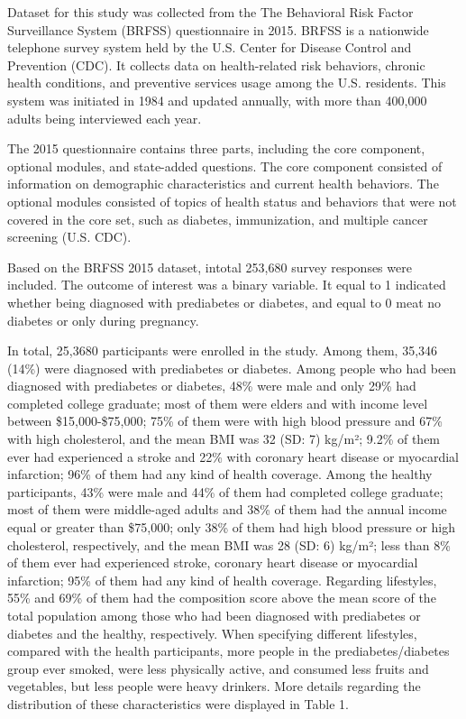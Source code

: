 \documentclass[
  12pt,
]{article}
\begin{document}
Dataset for this study was collected from the The Behavioral Risk Factor
Surveillance System (BRFSS) questionnaire in 2015. BRFSS is a nationwide
telephone survey system held by the U.S. Center for Disease Control and
Prevention (CDC). It collects data on health-related risk behaviors,
chronic health conditions, and preventive services usage among the U.S.
residents. This system was initiated in 1984 and updated annually, with
more than 400,000 adults being interviewed each year.

The 2015 questionnaire contains three parts, including the core
component, optional modules, and state-added questions. The core
component consisted of information on demographic characteristics and
current health behaviors. The optional modules consisted of topics of
health status and behaviors that were not covered in the core set, such
as diabetes, immunization, and multiple cancer screening (U.S. CDC).

Based on the BRFSS 2015 dataset, intotal 253,680 survey responses were
included. The outcome of interest was a binary variable. It equal to 1
indicated whether being diagnosed with prediabetes or diabetes, and
equal to 0 meat no diabetes or only during pregnancy.

In total, 25,3680 participants were enrolled in the study. Among them,
35,346 (14\%) were diagnosed with prediabetes or diabetes. Among people
who had been diagnosed with prediabetes or diabetes, 48\% were male and
only 29\% had completed college graduate; most of them were elders and
with income level between \$15,000-\$75,000; 75\% of them were with high
blood pressure and 67\% with high cholesterol, and the mean BMI was 32
(SD: 7) kg/m²; 9.2\% of them ever had experienced a stroke and 22\% with
coronary heart disease or myocardial infarction; 96\% of them had any
kind of health coverage. Among the healthy participants, 43\% were male
and 44\% of them had completed college graduate; most of them were
middle-aged adults and 38\% of them had the annual income equal or
greater than \$75,000; only 38\% of them had high blood pressure or high
cholesterol, respectively, and the mean BMI was 28 (SD: 6) kg/m²; less
than 8\% of them ever had experienced stroke, coronary heart disease or
myocardial infarction; 95\% of them had any kind of health coverage.
Regarding lifestyles, 55\% and 69\% of them had the composition score
above the mean score of the total population among those who had been
diagnosed with prediabetes or diabetes and the healthy, respectively.
When specifying different lifestyles, compared with the health
participants, more people in the prediabetes/diabetes group ever smoked,
were less physically active, and consumed less fruits and vegetables,
but less people were heavy drinkers. More details regarding the
distribution of these characteristics were displayed in Table 1.
\end{document}

